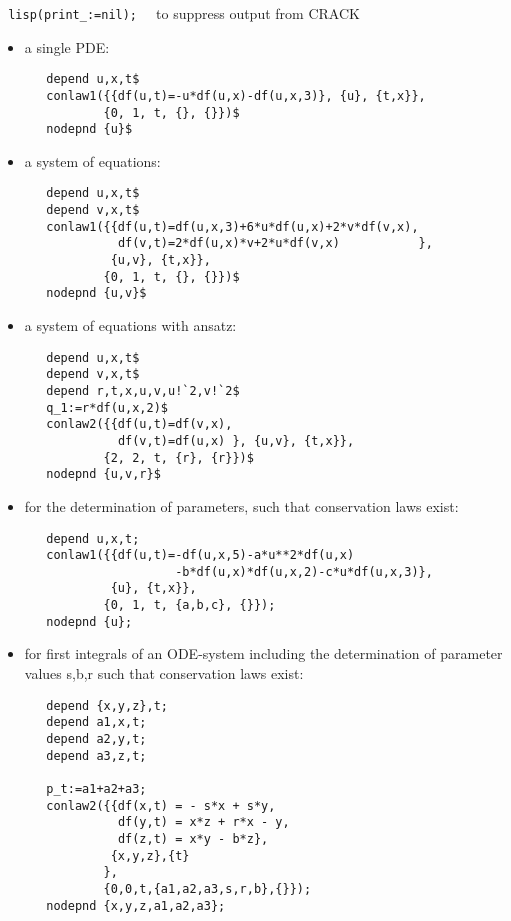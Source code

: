 \documentclass[12pt]{article}
\begin{document}
\verb+ lisp(print_:=nil);  +   to suppress output from CRACK 
\begin{itemize}
\item a single PDE:
\begin{verbatim}
   depend u,x,t$
   conlaw1({{df(u,t)=-u*df(u,x)-df(u,x,3)}, {u}, {t,x}},
           {0, 1, t, {}, {}})$
   nodepnd {u}$
\end{verbatim}

\item a system of equations:
\begin{verbatim}
   depend u,x,t$
   depend v,x,t$
   conlaw1({{df(u,t)=df(u,x,3)+6*u*df(u,x)+2*v*df(v,x),
             df(v,t)=2*df(u,x)*v+2*u*df(v,x)           }, 
            {u,v}, {t,x}},
           {0, 1, t, {}, {}})$
   nodepnd {u,v}$
\end{verbatim}

\item a system of equations with ansatz:
\begin{verbatim}
   depend u,x,t$
   depend v,x,t$
   depend r,t,x,u,v,u!`2,v!`2$
   q_1:=r*df(u,x,2)$
   conlaw2({{df(u,t)=df(v,x),
             df(v,t)=df(u,x) }, {u,v}, {t,x}},
           {2, 2, t, {r}, {r}})$
   nodepnd {u,v,r}$
\end{verbatim}

\item for the 
determination of parameters, such that conservation laws exist:
\begin{verbatim}
   depend u,x,t;
   conlaw1({{df(u,t)=-df(u,x,5)-a*u**2*df(u,x)
                     -b*df(u,x)*df(u,x,2)-c*u*df(u,x,3)}, 
            {u}, {t,x}},
           {0, 1, t, {a,b,c}, {}});
   nodepnd {u};
\end{verbatim}

\item for first integrals of an ODE-system including the determination of
parameter values s,b,r such that conservation laws exist:
\begin{verbatim}
   depend {x,y,z},t;
   depend a1,x,t;
   depend a2,y,t;
   depend a3,z,t;

   p_t:=a1+a2+a3;
   conlaw2({{df(x,t) = - s*x + s*y,
             df(y,t) = x*z + r*x - y,
             df(z,t) = x*y - b*z},
            {x,y,z},{t}
           },
           {0,0,t,{a1,a2,a3,s,r,b},{}});
   nodepnd {x,y,z,a1,a2,a3};
\end{verbatim}

\end{itemize}
\end{document}
